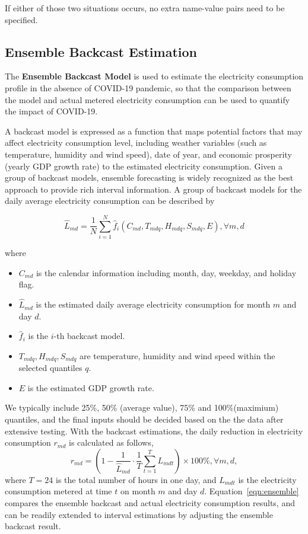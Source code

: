 \documentclass[11pt]{article}
\numberwithin{equation}{section}
\numberwithin{table}{section}
\numberwithin{figure}{section}
\begin{document}
If either of those two situations occurs, no extra name-value pairs need to be specified.



\subsection{Ensemble Backcast Estimation}
The \textbf{Ensemble Backcast Model} is used to estimate the electricity consumption profile in the absence of COVID-19 pandemic, so that the comparison between the model and actual metered electricity consumption can be used to quantify the impact of COVID-19.

A backcast model is expressed as a function that maps potential factors that may affect electricity consumption level, including weather variables (such as temperature, humidity and wind speed), date of year, and economic prosperity (yearly GDP growth rate) to the estimated electricity consumption. Given a group of backcast models, ensemble forecasting is widely recognized as the best approach to provide rich interval information. A group of backcast models for the daily average electricity consumption can be described by

\begin{equation*}
  \hat L_{md}=\frac{1}{N}\sum\limits_{i=1}^N \hat f_i(C_{md}, T_{mdq}, H_{mdq}, S_{mdq}, E),\forall m,d
\end{equation*}

where 
\begin{itemize}
  \item $C_{md}$ is the calendar information including month, day, weekday, and holiday flag.
  \item $\hat L_{md}$ is the estimated daily average electricity consumption for month $m$ and day $d$.
  \item $\hat f_i$ is the $i$-th backcast model.
  \item $T_{mdq},H_{mdq},S_{mdq}$ are temperature, humidity and wind speed within the selected quantiles $q$.
  \item $E$ is the estimated GDP growth rate.
\end{itemize}
We typically include 25\%, 50\% (average value), 75\% and 100\%(maximium) quantiles, and the final inputs should be decided based on the the data after extensive testing. With the backcast estimations, the daily reduction in electricity consumption $r_{md}$ is calculated as follows,
\begin{equation}
  \label{eqn:ensemble}
  r_{md}=(1-\frac{1}{\hat L_{md}}\cdot \frac{1}{T}\sum\limits_{t=1}^TL_{mdt})\times 100\%, \forall m,d,
\end{equation}
where $T=24$ is the total number of hours in one day, and $L_{mdt}$ is the electricity consumption metered at time $t$ on month $m$ and day $d$. Equation~\ref{eqn:ensemble} compares the ensemble backcast and actual electricity consumption results, and can be readily extended to interval estimations by adjusting the ensemble backcast result.
\end{document}

